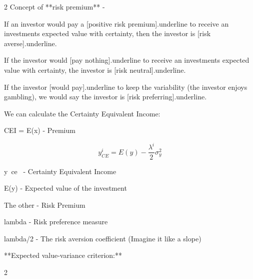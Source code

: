 \documentclass{article}
\begin{document}
\begin{multicols}{2}
Concept of **risk premium** -

If an investor would pay a [positive risk premium]{.underline} to receive an investments expected value with certainty, then the investor is [risk averse]{.underline}.

If the investor would [pay nothing]{.underline} to receive an investments expected value with certainty, the investor is [risk neutral]{.underline}.

If the investor [would pay]{.underline} to keep the variability (the investor enjoys gambling), we would say the investor is [risk preferring]{.underline}.

We can calculate the Certainty Equivalent Income:

CEI = E(x) - Premium

$$
y_{C E}^i=E(y)-\frac{\lambda^i}{2} \sigma_y^2
$$

y~ce~ - Certainty Equivalent Income

E(y) - Expected value of the investment

The other - Risk Premium

lambda - Risk preference measure

lambda/2 - The risk aversion coefficient (Imagine it like a slope)

**Expected value-variance criterion:**

\end{multicols}{2}  
\end{document}
